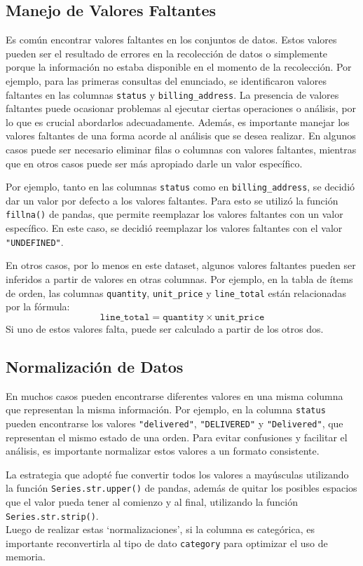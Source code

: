 \subsection{Manejo de Valores Faltantes}

Es común encontrar valores faltantes en los conjuntos de datos. Estos valores pueden ser el resultado de errores en la recolección de datos o simplemente porque la información no estaba disponible en el momento de la recolección. Por ejemplo, para las primeras consultas del enunciado, se identificaron valores faltantes en las columnas \texttt{status} y \texttt{billing\_address}.
La presencia de valores faltantes puede ocasionar problemas al ejecutar ciertas operaciones o análisis, por lo que es crucial abordarlos adecuadamente.
Además, es importante manejar los valores faltantes de una forma acorde al análisis que se desea realizar. En algunos casos puede ser necesario eliminar filas o columnas con valores faltantes, mientras que en otros casos puede ser más apropiado darle un valor específico.

Por ejemplo, tanto en las columnas \texttt{status} como en \texttt{billing\_address}, se decidió dar un valor por defecto a los valores faltantes. Para esto se utilizó la función \texttt{fillna()} de pandas, que permite reemplazar los valores faltantes con un valor específico. En este caso, se decidió reemplazar los valores faltantes con el valor \texttt{"UNDEFINED"}.

En otros casos, por lo menos en este dataset, algunos valores faltantes pueden ser inferidos a partir de valores en otras columnas. Por ejemplo, en la tabla de ítems de orden, las columnas \texttt{quantity}, \texttt{unit\_price} y \texttt{line\_total} están relacionadas por la fórmula:
\[\texttt{line\_total} = \texttt{quantity} \times \texttt{unit\_price}\] \label{datos:order_items_quantity}
Si uno de estos valores falta, puede ser calculado a partir de los otros dos.

\subsection{Normalización de Datos}

En muchos casos pueden encontrarse diferentes valores en una misma columna que representan la misma información. Por ejemplo, en la columna \texttt{status} pueden encontrarse los valores \texttt{"delivered"}, \texttt{"DELIVERED"} y \texttt{"Delivered"}, que representan el mismo estado de una orden. Para evitar confusiones y facilitar el análisis, es importante normalizar estos valores a un formato consistente.

La estrategia que adopté fue convertir todos los valores a mayúsculas utilizando la función \texttt{Series.str.upper()} de pandas, además de quitar los posibles espacios que el valor pueda tener al comienzo y al final, utilizando la función \texttt{Series.str.strip()}. \\
Luego de realizar estas `normalizaciones', si la columna es categórica, es importante reconvertirla al tipo de dato \texttt{category} para optimizar el uso de memoria.